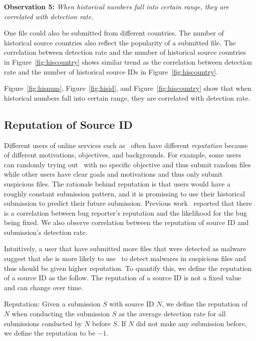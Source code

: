{\bf Observation 5:} 
{\em {\color{red} When historical numbers fall into certain range, they are correlated with detection rate. }}

One file could also be submitted from different countries. 
The number of historical source countries also reflect the popularity of a submitted file. 
The correlation between detection rate and the number of historical source countries in 
Figure~\ref{fig:hiscountry} shows similar trend as the correlation between detection rate 
and the number of historical source IDs in Figure~\ref{fig:hiscountry}. 

Figure~\ref{fig:hisnum}, Figure~\ref{fig:hisid}, and Figure~\ref{fig:hiscountry} show that 
when historical numbers fall into certain range, they are correlated with detection rate. 
\fi

\subsection{Reputation of Source ID}
\label{sec:reputation}


Different users of online services such as \vt\ often have different {\em reputation} 
because of different motivations, objectives, and backgrounds.
For example, some users can randomly trying out \vt\ with no specific objective and thus submit random files
while other users have clear goals and motivations and thus only submit suspicious files.
{\color{red} The rationale behind reputation is that \vt{} users would have a roughly constant submission pattern, 
and it is promissing to use their historical submission to predict their future submission.}
Previous work~\cite{GuoICSE2010} reported that there is a correlation between bug reporter’s reputation and the likelihood for the bug being fixed. 
We also observe correlation between the reputation of source ID and submission’s detection rate. 

Intuitively, a user that have submitted more files that were detected as malware suggest 
that she is more likely to use \vt\ to detect malwares in suspicious files 
and thus should be given higher reputation.
To quantify this, we define the reputation of a source ID as the follow.
The reputation of a source ID is not a fixed value and can change over time. 

\begin{definition}{Reputation:}
Given a submission $S$ with source ID $N$, 
we define the reputation of $N$ when conducting the submission $S$ as the average detection rate for all submissions conducted by $N$ before $S$. 
If $N$ did not make any submission before, we define the reputation to be $-1$. 
\end{definition}

